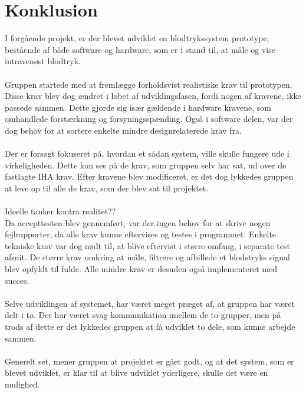 \chapter{Konklusion}
I forgående projekt, er der blevet udviklet en blodtrykssystem prototype, bestående af både software og hardware, som er i stand til, at måle og vise intravenøst blodtryk. \\
\\
Gruppen startede med at fremlægge forholdsvist realistiske krav til prototypen. Disse krav blev dog ændret i løbet af udviklingsfasen, fordi nogen af kravene, ikke passede sammen. Dette gjorde sig især gældende i hardware kravene, som omhandlede forstærkning og forsyningsspænding. Også i software delen, var der dog behov for at sortere enkelte mindre designrelaterede krav fra.  \\
\\
Der er forsøgt fokuseret på, hvordan et sådan system, ville skulle fungere ude i virkeligheden. Dette kan ses på de krav, som gruppen selv har sat, ud over de fastlagte IHA krav. Efter kravene blev modificeret, er det dog lykkedes gruppen at leve op til alle de krav, som der blev sat til projektet. \\
\\

Ideelle tanker kontra realitet??\\
Da accepttesten blev gennemført, var der ingen behov for at skrive nogen fejlrapporter, da alle krav kunne eftervises og testes i programmet. Enkelte tekniske krav var dog nødt til, at blive eftervist i større omfang, i separate test afsnit. De større krav omkring at måle, filtrere og afbillede et blodstryks signal blev opfyldt til fulde. Alle mindre krav er desuden også implementeret med succes. \\
\\
Selve udviklingen af systemet, har været meget præget af, at gruppen har været delt i to. Der har været svag kommunikation imellem de to grupper, men på trods af dette er det lykkedes gruppen at få udviklet to dele, som kunne arbejde sammen. \\
\\
Generelt set, mener gruppen at projektet er gået godt, og at det system, som er blevet udviklet, er klar til at blive udviklet yderligere, skulle det være en mulighed. \\
\\
